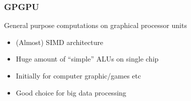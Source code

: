 \documentclass[xcolor=table]{beamer}
\begin{document}
\begin{frame}[fragile]
  \transwipe[direction=90]
  \frametitle{GPGPU}
  \begin{minipage}[m]{0.40\linewidth}
\end{minipage}\hfill
\begin{minipage}[m]{0.6\linewidth}
General purpose computations on graphical processor units
\begin{itemize}
      \item (Almost) SIMD architecture 
      \item Huge amount of ``simple'' ALUs on single chip
      \item Initially for computer graphic/games etc
      \item Good choice for big data processing   
\end{itemize}

\end{minipage}

\end{frame}
\end{document}
